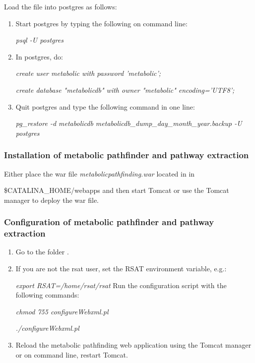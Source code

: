 \documentclass{book}
\begin{document}
\begin{enumerate}
\begin{enumerate}
Load the  file into postgres as follows:
\begin{enumerate}
\item Start postgres by typing the following on command line:

\textit{psql -U postgres}
\item In postgres, do:

\textit{create user metabolic with password 'metabolic';}

\textit{create database "metabolicdb" with owner "metabolic" encoding='UTF8';}
\item Quit postgres and type the following command in one line:

\textit{pg\_restore -d metabolicdb metabolicdb\_dump\_day\_month\_year.backup -U postgres}
\end{enumerate}

\end{enumerate}

\end{enumerate}

\subsubsection{Installation of metabolic pathfinder and pathway extraction}
Either place the war file \textit{metabolicpathfinding.war} located
in  in

\$CATALINA\_HOME/webapps and then start
Tomcat or use the Tomcat manager to deploy the war file.

\subsubsection{Configuration of metabolic pathfinder and pathway extraction}

\begin{enumerate}
\item Go to the folder .

\item If you are not the rsat user, set the RSAT environment variable, e.g.:

      \textit{export RSAT=/home/rsat/rsat}
      Run the configuration script with the following commands:

      \textit{chmod 755 configureWebxml.pl}

      \textit{./configureWebxml.pl}

\item Reload the metabolic pathfinding web application using the Tomcat manager or
      on command line, restart Tomcat.
\end{enumerate}
\end{document}
